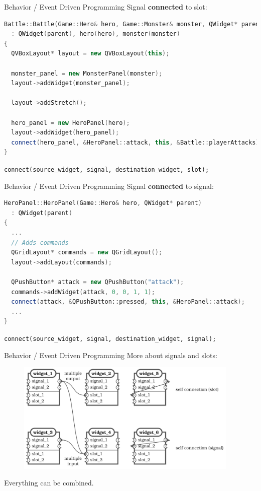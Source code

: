 \documentclass[11pt]{beamer}
\renewcommand{\emph}[1]{\textbf{#1}}
\begin{document}
\begin{frame}[fragile]{Behavior / Event Driven Programming}
 Signal \emph{connected} to slot:
 \begin{lstlisting}[language=C++]
Battle::Battle(Game::Hero& hero, Game::Monster& monster, QWidget* parent)
  : QWidget(parent), hero(hero), monster(monster)
{
  QVBoxLayout* layout = new QVBoxLayout(this);

  monster_panel = new MonsterPanel(monster);
  layout->addWidget(monster_panel);

  layout->addStretch();

  hero_panel = new HeroPanel(hero);
  layout->addWidget(hero_panel);
  connect(hero_panel, &HeroPanel::attack, this, &Battle::playerAttacks);
}
\end{lstlisting}
 \texttt{connect(source\_widget, signal, destination\_widget, slot);}
\end{frame}

\begin{frame}[fragile]{Behavior / Event Driven Programming}
 Signal \emph{connected} to signal:
 \begin{lstlisting}[language=C++]
HeroPanel::HeroPanel(Game::Hero& hero, QWidget* parent)
  : QWidget(parent)
{
  ...    
  // Adds commands
  QGridLayout* commands = new QGridLayout();
  layout->addLayout(commands);

  QPushButton* attack = new QPushButton("attack");
  commands->addWidget(attack, 0, 0, 1, 1);
  connect(attack, &QPushButton::pressed, this, &HeroPanel::attack);
  ...
}
\end{lstlisting}
 \texttt{connect(source\_widget, signal, destination\_widget, signal);}
\end{frame}

\begin{frame}{Behavior / Event Driven Programming}
 More about signals and slots:
 \begin{figure}
  \includegraphics[width=0.95\textwidth]{assets/event-driven-programming-4}
 \end{figure}
 Everything can be combined.
\end{frame}
\end{document}
